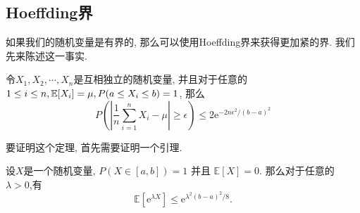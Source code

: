 \subsection{Hoeffding界}

如果我们的随机变量是有界的, 那么可以使用Hoeffding界来获得更加紧的界. 我们先来陈述这一事实. 

\begin{theorem}[Hoeffding界]
    令$X_1, X_2, \cdots, X_n$是互相独立的随机变量, 并且对于任意的$1\leq i\leq n, \mathbb E[X_i]=\mu, P(a\leq X_i \leq b)=1$, 那么
    $$
P\left(\left|\frac{1}{n} \sum_{i=1}^n X_i-\mu\right| \geq \epsilon\right) \leq 2 \mathrm{e}^{-2 n \epsilon^2 /(b-a)^2}
$$
\end{theorem}

要证明这个定理, 首先需要证明一个引理. 
\begin{lemma}
    设$X$是一个随机变量, $P(X \in[a, b])=1$ 并且 $\mathbb{E}[X]=0$. 那么对于任意的 $\lambda>0$,有
    $$
\mathbb{E}\left[\mathrm{e}^{\lambda X}\right] \leq \mathrm{e}^{\lambda^2(b-a)^2 / 8} .
$$
\end{lemma}


